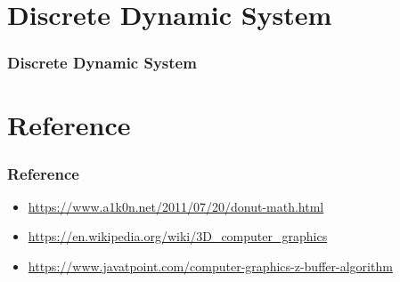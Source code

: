 \documentclass[12pt, t]{beamer}
\begin{document}

\section{Discrete Dynamic System}
\begin{frame}
    \frametitle{Discrete Dynamic System}

\end{frame}


\section{Reference}
\begin{frame}
    \frametitle{Reference}

    \small{
        \begin{itemize}
            \item \url{https://www.a1k0n.net/2011/07/20/donut-math.html}
            \item \url{https://en.wikipedia.org/wiki/3D_computer_graphics}
            \item \url{https://www.javatpoint.com/computer-graphics-z-buffer-algorithm}
        \end{itemize}
    }
    
\end{frame}
\end{document}
